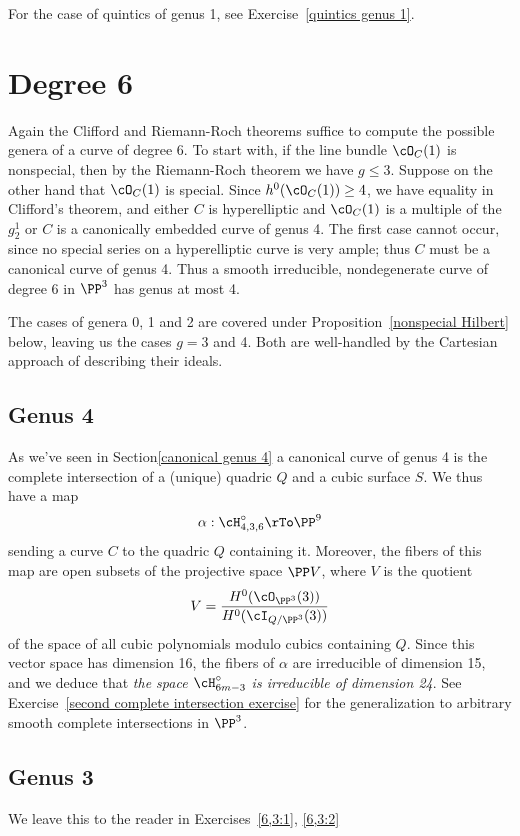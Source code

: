 For the case of quintics of genus 1, see Exercise~\ref{quintics genus 1}.

\section{Degree 6}

Again the Clifford and Riemann-Roch theorems suffice to compute the possible genera of a curve of degree 6. To start with,  if the line bundle $\cO_C(1)$ is nonspecial, then by the Riemann-Roch theorem we have $g \leq 3$. Suppose on the other hand that $\cO_C(1)$ is special. Since   $h^{0}(\cO_C(1)) \geq 4$, we have equality in Clifford's theorem, and either $C$ is hyperelliptic and $\cO_C(1)$ is a multiple of the $g^{1}_{2}$ or  $C$ is  a canonically embedded curve of genus 4. The first case cannot occur, since no special series on a hyperelliptic curve is very ample; thus $C$ must be a canonical curve of genus 4. Thus a smooth irreducible, nondegenerate curve of degree 6 in $\PP^3$ has genus at most 4.


The cases of genera 0, 1 and 2 are covered under Proposition~\ref{nonspecial Hilbert} below, leaving us the cases $g = 3$ and 4. Both are well-handled by the Cartesian approach of describing their ideals.

\subsection{Genus 4}

As we've seen in Section\ref{canonical genus 4} a canonical curve of genus 4 is the complete intersection of a (unique) quadric $Q$ and a cubic surface $S$. We thus have a map
$$
\alpha : \cH^\circ_{4,3,6} \rTo \PP^9
$$
sending a curve $C$ to the quadric $Q$ containing it. Moreover, the fibers of this map are open subsets of the projective space $\PP V$, where $V$ is the quotient
$$
V = \frac{H^0(\cO_{\PP^3}(3))}{H^0(\cI_{Q/\PP^3}(3))}
$$
of the space of all cubic polynomials modulo cubics containing $Q$. Since this vector space has dimension 16, the fibers of $\alpha$ are irreducible of dimension 15, and we deduce that \emph{the space $\cH^\circ_{6m-3}$ is irreducible of dimension 24}.
See Exercise~\ref{second complete intersection exercise} for the generalization to arbitrary smooth complete intersections in $\PP^3$.

\subsection{Genus 3}
We leave this to the reader in Exercises~\ref{6,3:1}, \ref{6,3:2}


